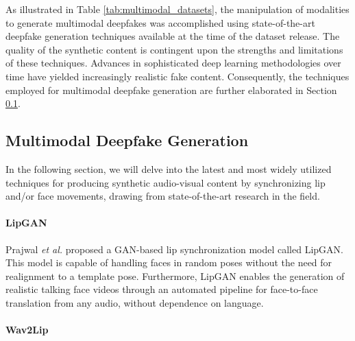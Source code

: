 As illustrated in Table \ref{tab:multimodal_datasets}, the manipulation of modalities to generate multimodal deepfakes was accomplished using state-of-the-art deepfake generation techniques available at the time of the dataset release. The quality of the synthetic content is contingent upon the strengths and limitations of these techniques. Advances in sophisticated deep learning methodologies over time have yielded increasingly realistic fake content. Consequently, the techniques employed for multimodal deepfake generation are further elaborated in Section \ref{subsec:multimodal_generation}.

\subsection{Multimodal Deepfake Generation}
\label{subsec:multimodal_generation}

In the following section, we will delve into the latest and most widely utilized techniques for producing synthetic audio-visual content by synchronizing lip and/or face movements, drawing from state-of-the-art research in the field.

\paragraph{LipGAN}
\label{para:multimodal_lipgan}

Prajwal \textit{et al.} \cite{kr2019towards} proposed a GAN-based lip synchronization model called LipGAN. This model is capable of handling faces in random poses without the need for realignment to a template pose. Furthermore, LipGAN enables the generation of realistic talking face videos through an automated pipeline for face-to-face translation from any audio, without dependence on language.

\paragraph{Wav2Lip}
\label{para:multimodal_wav2lip}

